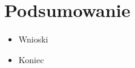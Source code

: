 \chapter{Podsumowanie} \label{chap:outro}

\begin{itemize}
 \item Wnioski
 \item Koniec
\end{itemize}
